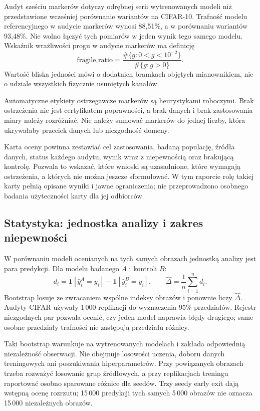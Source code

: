 \documentclass[12pt,a4paper]{article}
\begin{document}
Audyt sześciu markerów dotyczy odrębnej serii wytrenowanych modeli
niż przedstawione wcześniej porównanie wariantów na CIFAR-10.
Trafność modelu referencyjnego w audycie markerów wynosi 88,51\%,
a w porównaniu wariantów 93,48\%. Nie wolno łączyć tych pomiarów
w jeden wynik tego samego modelu.
Wskaźnik wrażliwości progu w audycie markerów ma definicję
\begin{equation}
\mathrm{fragile\_ratio}=
\frac{\#\{g:0<g<10^{-2}\}}{\#\{g:g>0\}}.
\end{equation}
Wartość bliska jedności mówi o dodatnich bramkach objętych mianownikiem,
nie o udziale wszystkich fizycznie usuniętych kanałów.

Automatyczne etykiety ostrzegawcze markerów są heurystykami roboczymi.
Brak ostrzeżenia nie jest certyfikatem poprawności, a brak danych i brak
zastosowania miary należy rozróżniać. Nie należy sumować markerów do jednej
liczby, która ukrywałaby przeciek danych lub niezgodność domeny.

Karta oceny powinna zestawiać cel zastosowania, badaną populację, źródła
danych, status każdego audytu, wynik wraz z niepewnością oraz brakującą
kontrolę. Pozwala to wskazać, które wnioski są uzasadnione, które wymagają
ostrzeżenia, a których nie można jeszcze sformułować. W tym raporcie rolę
takiej karty pełnią opisane wyniki i jawne ograniczenia; nie przeprowadzono
osobnego badania użyteczności karty dla jej odbiorców.

\subsection{Statystyka: jednostka analizy i zakres niepewności}

W porównaniu modeli ocenianych na tych samych obrazach jednostką
analizy jest para predykcji. Dla modelu badanego $A$ i kontroli $B$:
\begin{equation}
d_i=\mathbf{1}[\hat y_i^A=y_i]-\mathbf{1}[\hat y_i^B=y_i],
\qquad \widehat{\Delta}=\frac{1}{n}\sum_{i=1}^{n}d_i.
\end{equation}
Bootstrap losuje ze zwracaniem wspólne indeksy obrazów i ponownie liczy
$\widehat{\Delta}$. Audyty CIFAR używały 1\,000 replikacji do wyznaczenia
95\% przedziałów. Rejestr niezgodnych par pozwala ocenić, czy jeden
model naprawia błędy drugiego; same osobne przedziały trafności nie
zastępują przedziału różnicy.

Taki bootstrap warunkuje na wytrenowanych modelach i zakłada odpowiednią
niezależność obserwacji. Nie obejmuje losowości uczenia, doboru danych
treningowych ani poszukiwania hiperparametrów. Przy powiązanych obrazach
trzeba rozważyć losowanie grup źródłowych, a przy replikacjach treningu
raportować osobno sparowane różnice dla seedów. Trzy seedy early exit
dają wstępną ocenę rozrzutu; 15\,000 predykcji tych samych 5\,000 obrazów
nie oznacza 15\,000 niezależnych obrazów.
\end{document}
